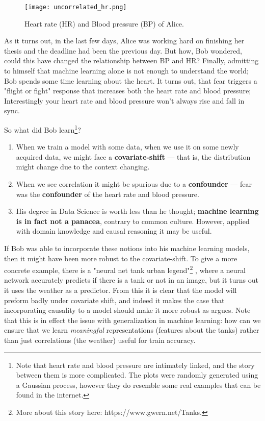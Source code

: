 \begin{figure}[H]
    \centering
    \texttt{[image: uncorrelated\_hr.png]}
    \caption{Heart rate (HR) and Blood pressure (BP) of Alice.}
\end{figure}

As it turns out, in the last few days, Alice was working hard on finishing her thesis and the deadline had been 
the previous day. But how, Bob wondered, could this have changed the relationship between BP and HR? 
Finally, admitting to himself that machine learning alone is not enough to understand the world; 
Bob spends some time learning about the heart. It turns out, that fear triggers a "flight or fight"
response that increases both the heart rate and blood pressure; Interestingly your heart rate and blood pressure 
won’t always rise and fall in sync.

So what did Bob learn\footnote{
    Note that heart rate and blood pressure are intimately linked, and the story between them is more complicated.
    The plots were randomly generated using a Gaussian process, however they do resemble some real examples that 
    can be found in the internet.
}?

\begin{enumerate}
    \item When we train a model with some data, when we use it on some newly acquired data, we might
    face a \textbf{covariate-shift} --- that is, the distribution might change due to the context changing.
    \item When we see correlation it might be spurious due to a \textbf{confounder} --- fear was the \textbf{confounder} 
    of the heart rate and blood pressure.
    \item His degree in Data Science is worth less than he thought; \textbf{machine learning is in fact not 
    a panacea}, contrary to common culture. However, applied with domain knowledge and causal reasoning
    it may be useful. 
\end{enumerate}

If Bob was able to incorporate these notions into his machine learning models, then it might have been more
robust to the covariate-shift. To give a more concrete example, there is a "neural net tank urban legend"\footnote{
    More about this story here: https://www.gwern.net/Tanks.
}
, where a neural network accurately predicts if there is a tank or not in an image, but it turns out it uses the 
weather as a predictor. From this it is clear that the model will preform badly under covariate shift, and indeed
it makes the case that incorporating causality to a model should make it more robust as
\cite{scholkopf2019causality} argues. Note that this is in effect the issue with generalization in machine learning:
how can we ensure that we learn \textit{meaningful} representations (features about the tanks) rather than just
correlations (the weather) useful for train accuracy. 

